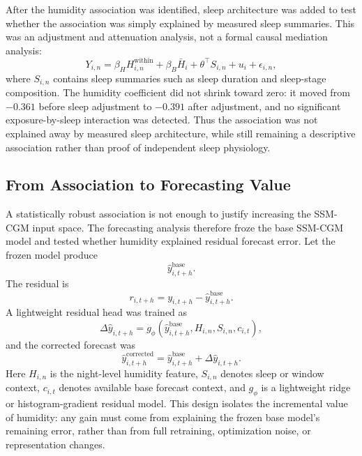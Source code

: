 After the humidity association was identified, sleep architecture was added to
test whether the association was simply explained by measured sleep summaries.
This was an adjustment and attenuation analysis, not a formal causal mediation
analysis:
\begin{equation}
Y_{i,n}
=
\beta_H H^{\mathrm{within}}_{i,n}
+
\beta_B \bar{H}_i
+
\theta^\top S_{i,n}
+
u_i
+
\epsilon_{i,n},
\label{eq:env_sleep_adjusted}
\end{equation}
where $S_{i,n}$ contains sleep summaries such as sleep duration and
sleep-stage composition. The humidity coefficient did not shrink toward zero:
it moved from $-0.361$ before sleep adjustment to $-0.391$ after adjustment,
and no significant exposure-by-sleep interaction was detected. Thus the
association was not explained away by measured sleep architecture, while still
remaining a descriptive association rather than proof of independent sleep
physiology.

\subsection{From Association to Forecasting Value}
\label{subsec:env_forecasting_value}

A statistically robust association is not enough to justify increasing the
SSM-CGM input space. The forecasting analysis therefore froze the base SSM-CGM
model and tested whether humidity explained residual forecast error. Let the
frozen model produce
\begin{equation}
\hat{y}^{\mathrm{base}}_{i,t+h}.
\end{equation}
The residual is
\begin{equation}
r_{i,t+h} = y_{i,t+h} - \hat{y}^{\mathrm{base}}_{i,t+h}.
\end{equation}
A lightweight residual head was trained as
\begin{equation}
\Delta \hat{y}_{i,t+h}
=
g_{\phi}
\left(
\hat{y}^{\mathrm{base}}_{i,t+h},
H_{i,n},
S_{i,n},
c_{i,t}
\right),
\end{equation}
and the corrected forecast was
\begin{equation}
\hat{y}^{\mathrm{corrected}}_{i,t+h}
=
\hat{y}^{\mathrm{base}}_{i,t+h}
+
\Delta \hat{y}_{i,t+h}.
\end{equation}
Here $H_{i,n}$ is the night-level humidity feature, $S_{i,n}$ denotes sleep or
window context, $c_{i,t}$ denotes available base forecast context, and
$g_{\phi}$ is a lightweight ridge or histogram-gradient residual model. This
design isolates the incremental value of humidity: any gain must come from
explaining the frozen base model's remaining error, rather than from full
retraining, optimization noise, or representation changes.

